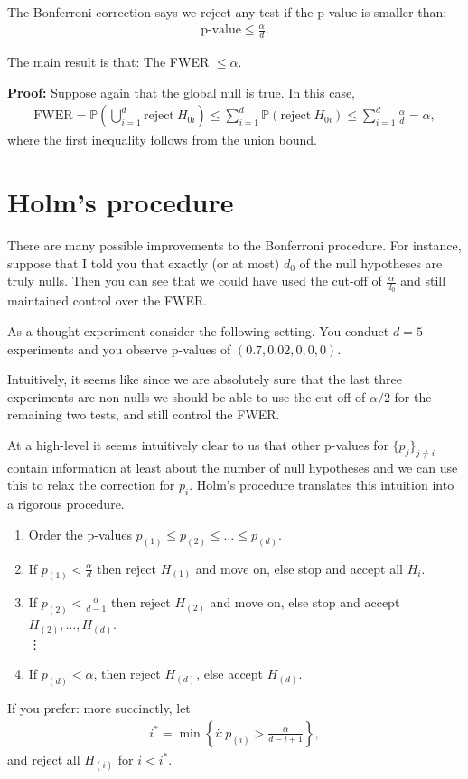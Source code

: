 \documentclass[twoside,12pt]{article}
\begin{document}
The Bonferroni correction says we reject any test if the p-value is smaller than:
\begin{align*}
\text{p-value} \leq \frac{\alpha}{d}.
\end{align*}

The main result is that: The FWER $\leq \alpha$.

{\bf Proof: } Suppose again that the global null is true. In this case,
\begin{align*}
\text{FWER} = \mathbb{P}\left(\bigcup_{i=1}^d \text{reject}~H_{0i}\right) \leq
\sum_{i=1}^d \mathbb{P} \left( \text{reject}~H_{0i}\right) \leq \sum_{i=1}^d \frac{\alpha}{d} = \alpha,
\end{align*}
where the first inequality follows from the union bound.


\section{Holm's procedure}
There are many possible improvements to the Bonferroni procedure. For instance, suppose that I told you that exactly (or at most) $d_0$ of the null hypotheses are truly nulls. Then you can see that we could have used the cut-off of $\frac{\alpha}{d_0}$ and still maintained control over the FWER.

As a thought experiment consider the following setting. You conduct $d = 5$ experiments and you observe p-values of $(0.7, 0.02,0, 0, 0)$.

Intuitively, it seems like since we are absolutely sure that the last three experiments are non-nulls we should be able to use the cut-off of $\alpha/2$ for the remaining two tests, and still control the FWER.

At a high-level it seems intuitively clear to us that other p-values for $\{p_j\}_{j \neq i}$ contain information at least about the number of null hypotheses and we can use this to relax the correction for $p_i$. Holm's procedure translates this intuition into a rigorous procedure.

\begin{enumerate}
\item Order the p-values $p_{(1)} \leq p_{(2)} \leq \ldots \leq p_{(d)}$.
\item If $p_{(1)} < \frac{\alpha}{d}$ then reject $H_{(1)}$ and move on, else stop and accept all $H_i$.
\item If $p_{(2)} < \frac{\alpha}{d - 1}$ then reject $H_{(2)}$ and move on, else stop and accept $H_{(2)}, \ldots, H_{(d)}$. \\
 \vdots
\item If $p_{(d)} < \alpha$, then reject $H_{(d)}$, else accept $H_{(d)}$.
\end{enumerate}
If you prefer: more succinctly, let 
\begin{align*}
i^* = \min \left\{ i: p_{(i)} > \frac{\alpha}{d - i + 1} \right\},
\end{align*}
and reject all $H_{(i)}$ for $i < i^*$.
\end{document}
